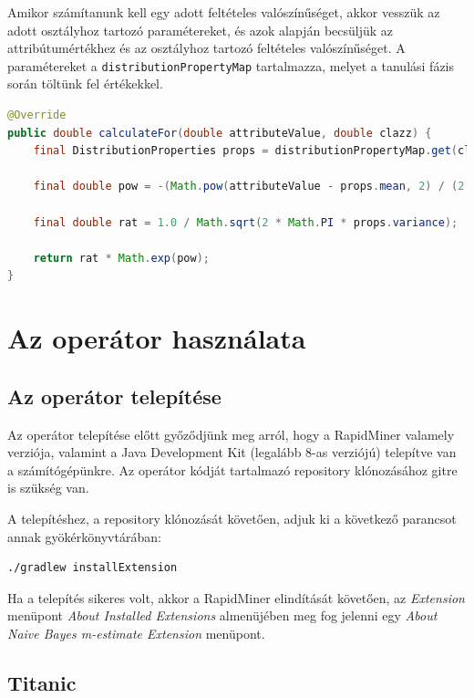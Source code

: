 \documentclass[a4paper]{article}
\begin{document}
Amikor számítanunk kell egy adott feltételes valószínűséget, akkor vesszük az adott osztályhoz tartozó paramétereket, és azok alapján becsüljük az attribútumértékhez és az osztályhoz tartozó feltételes valószínűséget. A paramétereket a \texttt{distributionPropertyMap} tartalmazza, melyet a tanulási fázis során töltünk fel értékekkel.

\begin{lstlisting}[language=Java, caption={Nominális attribútum feltételes valószínűségének kiszámítása.}, captionpos=b, escapechar=$]
@Override
public double calculateFor(double attributeValue, double clazz) {
    final DistributionProperties props = distributionPropertyMap.get(clazz);

    final double pow = -(Math.pow(attributeValue - props.mean, 2) / (2 * props.variance));

    final double rat = 1.0 / Math.sqrt(2 * Math.PI * props.variance);

    return rat * Math.exp(pow);
}
\end{lstlisting}

\section{Az operátor használata}
\subsection{Az operátor telepítése}
Az operátor telepítése előtt győződjünk meg arról, hogy a RapidMiner valamely verziója, valamint a Java Development Kit (legalább 8-as verziójú) telepítve van a számítógépünkre. Az operátor kódját tartalmazó repository klónozásához gitre is szükség van.

A telepítéshez, a repository klónozását követően, adjuk ki a következő parancsot annak gyökérkönyvtárában:

\begin{lstlisting}[language=bash, caption={Az operátor telepítése.}, captionpos=b, escapechar=$]
./gradlew installExtension
\end{lstlisting}

Ha a telepítés sikeres volt, akkor a RapidMiner elindítását követően, az \textit{Extension} menüpont \textit{About Installed Extensions} almenüjében meg fog jelenni egy \textit{About Naive Bayes m-estimate Extension} menüpont.

\pagebreak

\subsection{Titanic}
\end{document}
